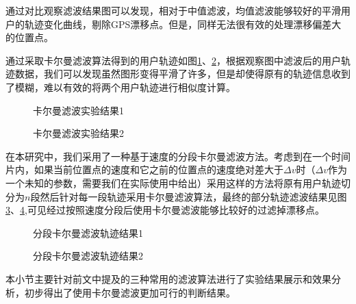 \par 通过对比观察滤波结果图可以发现，相对于中值滤波，均值滤波能够较好的平滑用户的轨迹变化曲线，剔除GPS漂移点。但是，同样无法很有效的处理漂移偏差大的位置点。
\par 通过采取卡尔曼滤波算法得到的用户轨迹如图\ref{fig:3_4_1}、\ref{fig:3_4_2}，根据观察图中滤波后的用户轨迹数据，我们可以发现虽然图形变得平滑了许多，但是却使得原有的轨迹信息收到了模糊，难以有效的将两个用户轨迹进行相似度计算。
\begin{figure}[htb]
  \centering%
  \hspace{4em}%
  \caption{卡尔曼滤波实验结果1}
  \label{fig:3_4_1}
\end{figure}
\begin{figure}[htb]
  \centering%
  \hspace{4em}%
  \caption{卡尔曼滤波实验结果2}
  \label{fig:3_4_2}
\end{figure}
\par 在本研究中，我们采用了一种基于速度的分段卡尔曼滤波方法。考虑到在一个时间片内，如果当前位置点的速度和它之前的位置点的速度绝对差大于$\Delta v$时（$\Delta v$作为一个未知的参数，需要我们在实际使用中给出）采用这样的方法将原有用户轨迹切分为$n$段然后针对每一段轨迹采用卡尔曼滤波算法，最终的部分轨迹滤波结果见图\ref{fig:3_5_1}、\ref{fig:3_5_2},可见经过按照速度分段后使用卡尔曼滤波能够比较好的过滤掉漂移点。
\begin{figure}[htb]
  \centering%
  \hspace{4em}%
  \caption{分段卡尔曼滤波轨迹结果1}
  \label{fig:3_5_1}
\end{figure}
\begin{figure}[htb]
  \centering%
  \hspace{4em}%
  \caption{分段卡尔曼滤波轨迹结果2}
  \label{fig:3_5_2}
\end{figure}
\par 本小节主要针对前文中提及的三种常用的滤波算法进行了实验结果展示和效果分析，初步得出了使用卡尔曼滤波更加可行的判断结果。
